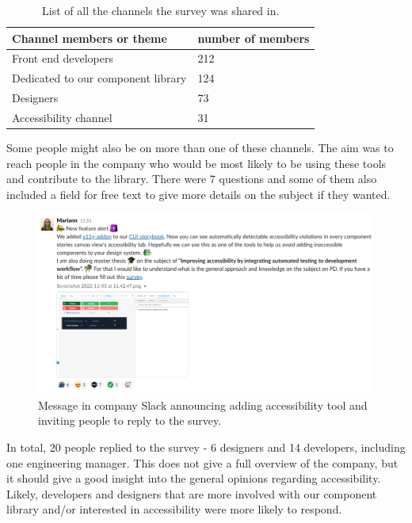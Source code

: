 \documentclass{master_thesis}
\begin{document}
\begin{table}[H]
	\centering
	\begin{tabular}{|l|l|}
		\hline
		\textbf{Channel members or theme} & \textbf{number of members}  \\
		\hline
		Front end developers  & 212  \\
		\hline
		Dedicated to our component library  & 124  \\
		\hline
		Designers  & 73  \\
		\hline
		Accessibility channel  & 31  \\
		\hline
	\end{tabular}
	\caption{List of all the channels the survey was shared in.}
	\label{table:survey-shared}
\end{table}

Some people might also be on more than one of these channels. The aim was to reach people in the company who would be most likely to be using these tools and contribute to the library. There were 7 questions and some of them also included a field for free text to give more details on the subject if they wanted.

\begin{figure}[H]
	\centering
	\includegraphics[width=\textwidth]{img/survey.png}
	\caption{Message in company Slack announcing adding accessibility tool and inviting people to reply to the survey.}
	\label{fig:slack-message}
\end{figure}

In total, 20 people replied to the survey - 6 designers and 14 developers, including one engineering manager. This does not give a full overview of the company, but it should give a good insight into the general opinions regarding accessibility. Likely, developers and designers that are more involved with our component library and/or interested in accessibility were more likely to respond.
\end{document}

